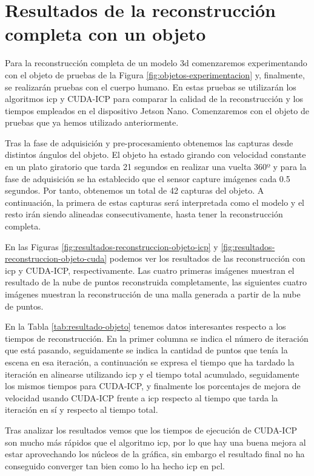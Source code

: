 \section{Resultados de la reconstrucción completa con un objeto}

Para la reconstrucción completa de un modelo \gls{3d} comenzaremos experimentando con el objeto de pruebas de la Figura \ref{fig:objetos-experimentacion} y, finalmente, se realizarán pruebas con el cuerpo humano.
En estas pruebas se utilizarán los algoritmos \gls{icp} y CUDA-ICP para comparar la calidad de la reconstrucción y los tiempos empleados en el dispositivo Jetson Nano.
Comenzaremos con el objeto de pruebas que ya hemos utilizado anteriormente.

Tras la fase de adquisición y pre-procesamiento obtenemos las capturas desde distintos ángulos del objeto.
El objeto ha estado girando con velocidad constante en un plato giratorio que tarda 21 segundos en realizar una vuelta 360º y para la fase de adquisición se ha establecido que el sensor capture imágenes cada 0.5 segundos.
Por tanto, obtenemos un total de 42 capturas del objeto.
A continuación, la primera de estas capturas será interpretada como el modelo y el resto irán siendo alineadas consecutivamente, hasta tener la reconstrucción completa.

En las Figuras \ref{fig:resultados-reconstruccion-objeto-icp} y \ref{fig:resultados-reconstruccion-objeto-cuda} podemos ver los resultados de las reconstrucción con \gls{icp} y CUDA-ICP, respectivamente.
Las cuatro primeras imágenes muestran el resultado de la nube de puntos reconstruida completamente, las siguientes cuatro imágenes muestran la reconstrucción de una malla generada a partir de la nube de puntos.

En la Tabla \ref{tab:resultado-objeto} tenemos datos interesantes respecto a los tiempos de reconstrucción. En la primer columna se indica el número de iteración que está pasando, seguidamente se indica la cantidad de puntos que tenía la escena en esa iteración, a continuación se expresa el tiempo que ha tardado la iteración en alinearse utilizando \gls{icp} y el tiempo total acumulado, seguidamente los mismos tiempos para CUDA-ICP, y finalmente los porcentajes de mejora de velocidad usando CUDA-ICP frente a \gls{icp} respecto al tiempo que tarda la iteración en sí y respecto al tiempo total.

Tras analizar los resultados vemos que los tiempos de ejecución de CUDA-ICP son mucho más rápidos que el algoritmo \gls{icp}, por lo que hay una buena mejora al estar aprovechando los núcleos de la gráfica, sin embargo el resultado final no ha conseguido converger tan bien como lo ha hecho \gls{icp} en \gls{pcl}.

